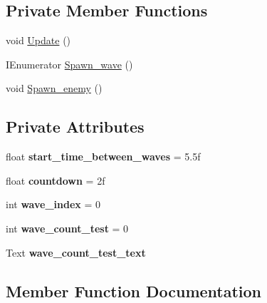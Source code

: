 \subsection*{Private Member Functions}
\begin{DoxyCompactItemize}
\item 
void \hyperlink{classwave__spawner_ae049116b14cb20519c1c5a2dc2b824d8}{Update} ()
\item 
I\+Enumerator \hyperlink{classwave__spawner_ad77dc8cd1dbf901d7be2336b5768829e}{Spawn\+\_\+wave} ()
\item 
void \hyperlink{classwave__spawner_a21e2893023c0716bee2f0811eaee7fa2}{Spawn\+\_\+enemy} ()
\end{DoxyCompactItemize}
\subsection*{Private Attributes}
\begin{DoxyCompactItemize}
\item 
\mbox{\label{classwave__spawner_a6f2f5e8ba354225136c8c116508ca207}} 
float {\bfseries start\+\_\+time\+\_\+between\+\_\+waves} = 5.\+5f
\item 
\mbox{\label{classwave__spawner_af3057e46998da1c5bee5cc59f1bf6287}} 
float {\bfseries countdown} = 2f
\item 
\mbox{\label{classwave__spawner_a8befc58cd3205bc2419130ea673bafbc}} 
int {\bfseries wave\+\_\+index} = 0
\item 
\mbox{\label{classwave__spawner_aaca06bce5c3dce2a136ef86051580b9c}} 
int {\bfseries wave\+\_\+count\+\_\+test} = 0
\item 
\mbox{\label{classwave__spawner_a70cfa3a01164c8cd2bb2a7fcad47fd2c}} 
Text {\bfseries wave\+\_\+count\+\_\+test\+\_\+text}
\end{DoxyCompactItemize}


\subsection{Member Function Documentation}
\mbox{\label{classwave__spawner_a21e2893023c0716bee2f0811eaee7fa2}} 
